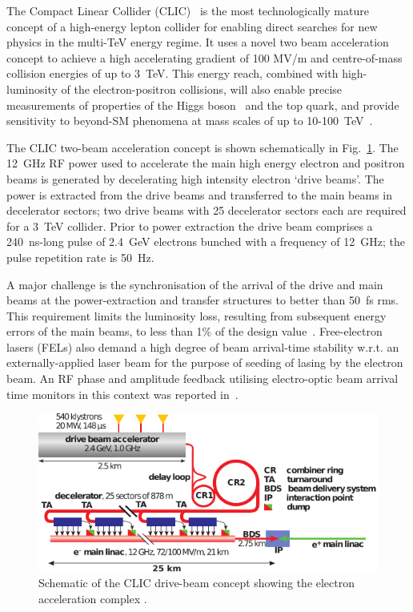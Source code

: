 \documentclass[%
 reprint,
 superscriptaddress,
 amsmath,
 amssymb,
 prl,
]{revtex4-1}
\begin{document}
The Compact Linear Collider (CLIC)~\cite{CLICCDR} is the most technologically 
mature concept of a high-energy lepton collider for enabling direct searches 
for new physics in the multi-TeV energy regime. It uses a novel two 
beam acceleration concept to achieve a high accelerating gradient of 100 MV/m 
and centre-of-mass collision energies of up to 3~TeV. This energy reach, 
combined with high-luminosity of the electron-positron collisions, will also 
enable precise measurements of properties of the Higgs boson~\cite{CLIC-Higgs} 
and the top quark, and provide sensitivity to beyond-SM phenomena at mass 
scales of up to 10-100~TeV~\cite{CLIC-staging}.

The CLIC two-beam acceleration concept is shown schematically in 
Fig.~\ref{fig:CLICLayout}. The 12~GHz RF power used to accelerate the main high 
energy electron and positron beams is generated by decelerating high intensity 
electron `drive beams'. The power is extracted from the drive beams and 
transferred to the main beams in decelerator sectors; two drive 
beams with 25 decelerator sectors each are required for a 3~TeV collider. Prior 
to power extraction the drive beam comprises a 240~ns-long pulse of 2.4~GeV 
electrons bunched with a frequency of 12~GHz; the pulse repetition rate is 
50~Hz.

A major challenge is the synchronisation of the arrival of the drive and main 
beams at the power-extraction and transfer structures to better than 50~fs rms. 
This requirement limits the luminosity loss, resulting from subsequent 
energy errors of the main beams, to less than 1\% of the design 
value~\cite{clicLumEq}. Free-electron lasers (FELs) also demand a high degree 
of beam arrival-time stability w.r.t. an externally-applied laser beam for the 
purpose of seeding of lasing by the electron beam. An RF phase and amplitude 
feedback utilising electro-optic beam arrival time monitors in this context was 
reported in~\cite{flashPRL}.

\begin{figure}
	\includegraphics[width=\columnwidth]{fig1}
	\caption{\label{fig:CLICLayout} Schematic of the CLIC drive-beam 
	concept showing the electron acceleration complex \cite{CLIC-staging}.
	}
\end{figure}
\end{document}

